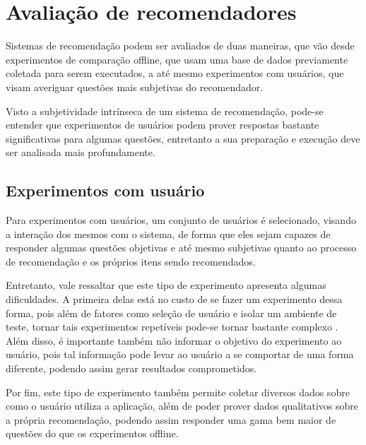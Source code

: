 \section{Avaliação de recomendadores}

Sistemas de recomendação podem ser avaliados de duas maneiras, que vão desde
experimentos de comparação offline, que usam uma base de dados previamente
coletada para serem executados, a até mesmo experimentos com usuários, que visam
averiguar questões mais subjetivas do recomendador.

Visto a subjetividade intrínseca de um sistema de recomendação, pode-se entender
que experimentos de usuários podem prover respostas bastante significativas para
algumas questões, entretanto a sua preparação e execução deve ser analisada mais
profundamente.

\subsection{Experimentos com usuário}

Para experimentos com usuários, um conjunto de usuários é selecionado, visando
a interação dos mesmos com o sistema, de forma que eles sejam capazes de responder algumas
questões objetivas e até mesmo subjetivas quanto ao processo de recomendação e
os próprios itens sendo recomendados.

Entretanto, vale ressaltar que este tipo de experimento apresenta algumas
dificuldades. A primeira delas está no custo de se fazer um experimento dessa
forma, pois além de fatores como seleção de usuário e isolar um ambiente de
teste, tornar tais experimentos repetíveis pode-se tornar bastante complexo
\cite{shani2011evaluating}. Além disso, é importante também não informar o
objetivo do experimento ao usuário, pois tal informação pode levar ao usuário a
se comportar de uma forma diferente, podendo assim gerar resultados
comprometidos.

Por fim, este tipo de experimento também permite coletar diversos dados sobre
como o usuário utiliza a aplicação, além de poder prover dados qualitativos
sobre a própria recomendação, podendo assim responder uma gama bem maior de
questões do que os experimentos offline.
